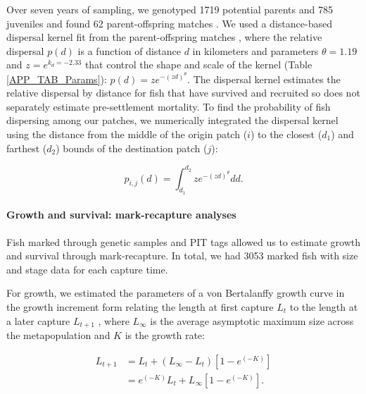 \documentclass[12pt, oneside]{article}   	%
\begin{document}
Over seven years of sampling, we genotyped 1719 potential parents and 785 juveniles and found 62 parent-offspring matches \citep{catalanoInPrepconnectivity}.
We used a distance-based dispersal kernel fit from the parent-offspring matches \citep{catalanoInPrepconnectivity, bode2018estimating}, where the relative dispersal $p(d)$ is a function of distance $d$ in kilometers and parameters $\theta = 1.19$ and $z = e^{k_d = -2.33}$ that control the shape and scale of the kernel (Table \ref{APP_TAB_Params}): $p(d) = ze^{-(zd)^\theta}$. The dispersal kernel estimates the relative dispersal by distance for fish that have survived and recruited so does not separately estimate pre-settlement mortality. To find the probability of fish dispersing among our patches, we numerically integrated the dispersal kernel using the distance from the middle of the origin patch ($i$) to the closest ($d_1$) and farthest ($d_2$) bounds of the destination patch ($j$):

\begin{equation} %
p_{i, j}(d) = \int_{d_1}^{d_2} z e^{-(zd)^\theta}  dd. \label{EQN_integratingDK}
\end{equation}

\paragraph*{Growth and survival: mark-recapture analyses}

Fish marked through genetic samples and PIT tags allowed us to estimate growth and survival through mark-recapture. In total, we had 3053 marked fish with size and stage data for each capture time. 

For growth, we estimated the parameters of a von Bertalanffy growth curve in the growth increment form relating the length at first capture $L_t$ to the length at a later capture $L_{t+1}$ \citep{hart2009estimating}, where $L_\infty$ is the average asymptotic maximum size across the metapopulation and $K$ is the growth rate: %

\begin{equation} \label{EQN_VBL} 
\begin{split}
L_{t+1} & = L_t + (L_\infty - L_t)[1 - e^{(-K)}] \\
 & = e^{(-K)}L_t + L_\infty[1 - e^{(-K)}].
\end{split}
\end{equation}
\end{document}
